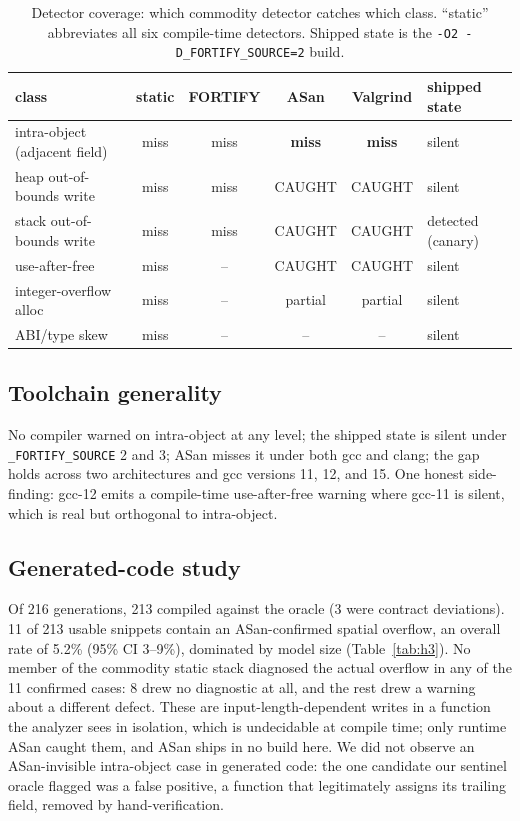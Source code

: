 \documentclass[11pt]{article}
\newcommand{\Ntotal}{216}
\newcommand{\Nusable}{213}
\newcommand{\Ncfail}{3}
\newcommand{\Nvuln}{11}
\newcommand{\RateAll}{5.2\%}
\newcommand{\RateAllCI}{3--9\%}
\newcommand{\StaticZero}{8}
\begin{document}
\begin{table}[h]\centering
\caption{Detector coverage: which commodity detector catches which class. ``static'' abbreviates all six
compile-time detectors. Shipped state is the \texttt{-O2 -D\_FORTIFY\_SOURCE=2} build.}
\label{tab:h1}
\begin{tabular}{lccccl}
\toprule
class & static & FORTIFY & ASan & Valgrind & shipped state \\
\midrule
intra-object (adjacent field) & miss & miss & \textbf{miss} & \textbf{miss} & silent \\
heap out-of-bounds write      & miss & miss & CAUGHT & CAUGHT & silent \\
stack out-of-bounds write     & miss & miss & CAUGHT & CAUGHT & detected (canary) \\
use-after-free                & miss & --   & CAUGHT & CAUGHT & silent \\
integer-overflow alloc        & miss & --   & partial & partial & silent \\
ABI/type skew                 & miss & --   & --     & --     & silent \\
\bottomrule
\end{tabular}
\end{table}

\subsection*{Toolchain generality}
No compiler warned on intra-object at any level; the shipped state is silent under
\texttt{\_FORTIFY\_SOURCE} 2 and 3; ASan misses it under both gcc and clang; the gap holds
across two architectures and gcc versions 11, 12, and 15. One honest side-finding: gcc-12
emits a compile-time use-after-free warning where gcc-11 is silent, which is real but
orthogonal to intra-object.

\subsection*{Generated-code study}
Of \Ntotal{} generations, \Nusable{} compiled against the oracle (\Ncfail{} were contract
deviations). \Nvuln{} of \Nusable{} usable snippets contain an ASan-confirmed spatial
overflow, an overall rate of \RateAll{} (95\% CI \RateAllCI{}), dominated by model size
(Table~\ref{tab:h3}). No member of the commodity static stack diagnosed the actual overflow
in any of the \Nvuln{} confirmed cases: \StaticZero{} drew no diagnostic at all, and the rest
drew a warning about a different defect. These are input-length-dependent writes in a function
the analyzer sees in isolation, which is undecidable at compile time; only runtime ASan caught
them, and ASan ships in no build here. We did not observe an ASan-invisible intra-object case
in generated code: the one candidate our sentinel oracle flagged was a false positive, a
function that legitimately assigns its trailing field, removed by hand-verification.
\end{document}
